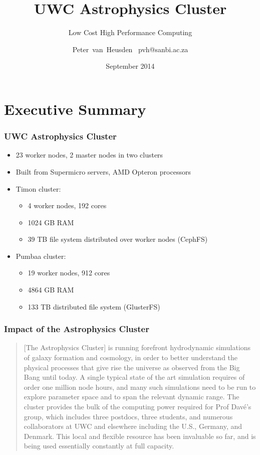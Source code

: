 \documentclass[handout]{beamer}
\title{UWC Astrophysics Cluster}
\subtitle{Low Cost High Performance Computing}
\author{\texorpdfstring{Peter~van~Heusden\newline
~pvh@sanbi.ac.za}{Peter~van~Heusden}}
\institute[UWC]
{
Information and Communication Services\\
University of the Western Cape\\
Bellville, South Africa\\
\insertlogo}
\date{September 2014}
\begin{document}
\begin{frame}
\logo{}
\titlepage
\end{frame}

\section{Executive Summary}
\begin{frame}
\frametitle{UWC Astrophysics Cluster}
\begin{itemize}
\item 23 worker nodes, 2 master nodes in two clusters
\item Built from Supermicro servers, AMD Opteron processors
\item Timon cluster:
\begin{itemize}
\item 4 worker nodes, 192 cores
\item 1024 GB RAM
\item 39 TB file system distributed over worker nodes (CephFS)
\end{itemize}
\item{Pumbaa cluster:}
\begin{itemize}
\item 19 worker nodes, 912 cores
\item 4864 GB RAM
\item 133 TB distributed file system (GlusterFS)
\end{itemize}
\end{itemize}
\end{frame}

\begin{frame}
\frametitle{Impact of the Astrophysics Cluster}
\begin{quotation}
[The Astrophysics Cluster] is running forefront hydrodynamic simulations of galaxy formation and cosmology, in order to better understand the physical processes that give rise the universe as observed from the Big Bang until today. A single typical state of the art simulation requires of order one million node hours, and many such simulations need to be run to explore parameter space and to span the relevant dynamic range. The cluster provides the bulk of the computing power required for Prof Dav\'{e}'s group, which includes three postdocs, three students, and numerous collaborators at UWC and elsewhere including the U.S., Germany, and Denmark. This local and flexible resource has been invaluable so far, and is being used essentially constantly at full capacity.
\end{quotation}
\end{frame}
\end{document}
